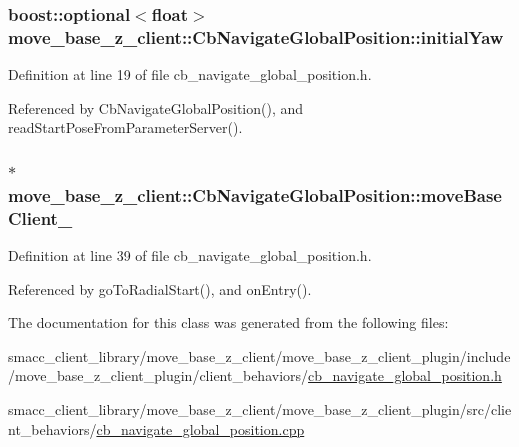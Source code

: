 \subsubsection[{\texorpdfstring{initial\+Yaw}{initialYaw}}]{\setlength{\rightskip}{0pt plus 5cm}boost\+::optional$<$float$>$ move\+\_\+base\+\_\+z\+\_\+client\+::\+Cb\+Navigate\+Global\+Position\+::initial\+Yaw}\hypertarget{classmove__base__z__client_1_1CbNavigateGlobalPosition_a339ec9b992e2565f404d8a2fa8a5be87}{}\label{classmove__base__z__client_1_1CbNavigateGlobalPosition_a339ec9b992e2565f404d8a2fa8a5be87}


Definition at line 19 of file cb\+\_\+navigate\+\_\+global\+\_\+position.\+h.



Referenced by Cb\+Navigate\+Global\+Position(), and read\+Start\+Pose\+From\+Parameter\+Server().

\subsubsection[{\texorpdfstring{move\+Base\+Client\+\_\+}{moveBaseClient_}}]{$\ast$ move\+\_\+base\+\_\+z\+\_\+client\+::\+Cb\+Navigate\+Global\+Position\+::move\+Base\+Client\+\_\+\hspace{0.3cm}{\ttfamily [private]}}\hypertarget{classmove__base__z__client_1_1CbNavigateGlobalPosition_a418cb1a461d6f28cb34908b739298657}{}\label{classmove__base__z__client_1_1CbNavigateGlobalPosition_a418cb1a461d6f28cb34908b739298657}


Definition at line 39 of file cb\+\_\+navigate\+\_\+global\+\_\+position.\+h.



Referenced by go\+To\+Radial\+Start(), and on\+Entry().



The documentation for this class was generated from the following files\+:\begin{DoxyCompactItemize}
\item 
smacc\+\_\+client\+\_\+library/move\+\_\+base\+\_\+z\+\_\+client/move\+\_\+base\+\_\+z\+\_\+client\+\_\+plugin/include/move\+\_\+base\+\_\+z\+\_\+client\+\_\+plugin/client\+\_\+behaviors/\hyperlink{cb__navigate__global__position_8h}{cb\+\_\+navigate\+\_\+global\+\_\+position.\+h}\item 
smacc\+\_\+client\+\_\+library/move\+\_\+base\+\_\+z\+\_\+client/move\+\_\+base\+\_\+z\+\_\+client\+\_\+plugin/src/client\+\_\+behaviors/\hyperlink{cb__navigate__global__position_8cpp}{cb\+\_\+navigate\+\_\+global\+\_\+position.\+cpp}\end{DoxyCompactItemize}
